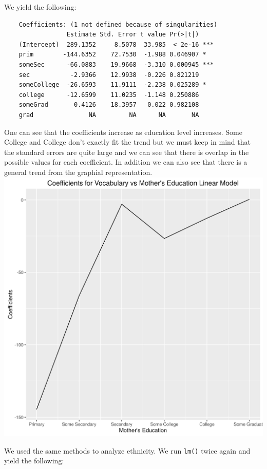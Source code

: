 \documentclass[fleqn]{article}
\begin{document}
	We yield the following:
	\begin{verbatim}
	Coefficients: (1 not defined because of singularities)
	             Estimate Std. Error t value Pr(>|t|)    
	(Intercept)  289.1352     8.5078  33.985  < 2e-16 ***
	prim        -144.6352    72.7530  -1.988 0.046907 *  
	someSec      -66.0883    19.9668  -3.310 0.000945 ***
	sec           -2.9366    12.9938  -0.226 0.821219    
	someCollege  -26.6593    11.9111  -2.238 0.025289 *  
	college      -12.6599    11.0235  -1.148 0.250886    
	someGrad       0.4126    18.3957   0.022 0.982108    
	grad               NA         NA      NA       NA
	\end{verbatim}
	One can see that the coefficients increase as education level increases. Some College and College don't exactly fit the trend but we must keep in mind that the standard errors are quite large and we can see that there is overlap in the possible values for each coefficient. In addition we can also see that there is a general trend from the graphial representation.\\
	\includegraphics{MomEd.png}

	We used the same methods to analyze ethnicity. We run \texttt{lm()} twice again and yield the following:
\end{document}
